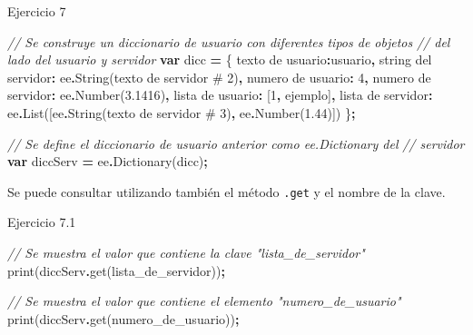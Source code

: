 \documentclass[
  12pt,
  letterpaper,
  twoside]{book}
\newenvironment{Shaded}{\begin{snugshade}}{\end{snugshade}}
\newcommand{\CommentTok}[1]{\textcolor[rgb]{0.56,0.35,0.01}{\textit{#1}}}
\newcommand{\DecValTok}[1]{\textcolor[rgb]{0.00,0.00,0.81}{#1}}
\newcommand{\FloatTok}[1]{\textcolor[rgb]{0.00,0.00,0.81}{#1}}
\newcommand{\FunctionTok}[1]{\textcolor[rgb]{0.00,0.00,0.00}{#1}}
\newcommand{\KeywordTok}[1]{\textcolor[rgb]{0.13,0.29,0.53}{\textbf{#1}}}
\newcommand{\NormalTok}[1]{#1}
\newcommand{\OperatorTok}[1]{\textcolor[rgb]{0.81,0.36,0.00}{\textbf{#1}}}
\newcommand{\StringTok}[1]{\textcolor[rgb]{0.31,0.60,0.02}{#1}}
\begin{document}
Ejercicio 7

\begin{Shaded}
\begin{Highlighting}[]
\CommentTok{// Se construye un diccionario de usuario con diferentes tipos de objetos}
\CommentTok{// del lado del usuario y servidor}
\KeywordTok{var}\NormalTok{ dicc }\OperatorTok{=}\NormalTok{ \{                                                 }
  \StringTok{\textquotesingle{}texto de usuario\textquotesingle{}}\OperatorTok{:}\StringTok{\textquotesingle{}usuario\textquotesingle{}}\OperatorTok{,}
  \StringTok{\textquotesingle{}string del servidor\textquotesingle{}}\OperatorTok{:}\NormalTok{ ee}\OperatorTok{.}\FunctionTok{String}\NormalTok{(}\StringTok{\textquotesingle{}texto de servidor \# 2\textquotesingle{}}\NormalTok{)}\OperatorTok{,}
  \StringTok{\textquotesingle{}numero de usuario\textquotesingle{}}\OperatorTok{:} \DecValTok{4}\OperatorTok{,}
  \StringTok{\textquotesingle{}numero de servidor\textquotesingle{}}\OperatorTok{:}\NormalTok{ ee}\OperatorTok{.}\FunctionTok{Number}\NormalTok{(}\FloatTok{3.1416}\NormalTok{)}\OperatorTok{,}
  \StringTok{\textquotesingle{}lista de usuario\textquotesingle{}}\OperatorTok{:}\NormalTok{ [}\DecValTok{1}\OperatorTok{,} \StringTok{\textquotesingle{}ejemplo\textquotesingle{}}\NormalTok{]}\OperatorTok{,}
  \StringTok{\textquotesingle{}lista de servidor\textquotesingle{}}\OperatorTok{:}\NormalTok{ ee}\OperatorTok{.}\FunctionTok{List}\NormalTok{([ee}\OperatorTok{.}\FunctionTok{String}\NormalTok{(}\StringTok{\textquotesingle{}texto de servidor \# 3\textquotesingle{}}\NormalTok{)}\OperatorTok{,} 
\NormalTok{    ee}\OperatorTok{.}\FunctionTok{Number}\NormalTok{(}\FloatTok{1.44}\NormalTok{)])}
\NormalTok{\}}\OperatorTok{;} 

\CommentTok{// Se define el diccionario de usuario anterior como ee.Dictionary del }
\CommentTok{// servidor }
\KeywordTok{var}\NormalTok{ diccServ }\OperatorTok{=}\NormalTok{ ee}\OperatorTok{.}\FunctionTok{Dictionary}\NormalTok{(dicc)}\OperatorTok{;}     
\end{Highlighting}
\end{Shaded}

Se puede consultar utilizando también el método \texttt{.get} y el nombre de la clave.

Ejercicio 7.1

\begin{Shaded}
\begin{Highlighting}[]
\CommentTok{// Se muestra el valor que contiene la clave "lista\_de\_servidor"}
\FunctionTok{print}\NormalTok{(diccServ}\OperatorTok{.}\FunctionTok{get}\NormalTok{(}\StringTok{\textquotesingle{}lista\_de\_servidor\textquotesingle{}}\NormalTok{))}\OperatorTok{;}

\CommentTok{// Se muestra el valor que contiene el elemento "numero\_de\_usuario"   }
\FunctionTok{print}\NormalTok{(diccServ}\OperatorTok{.}\FunctionTok{get}\NormalTok{(}\StringTok{\textquotesingle{}numero\_de\_usuario\textquotesingle{}}\NormalTok{))}\OperatorTok{;}        
\end{Highlighting}
\end{Shaded}
\end{document}
